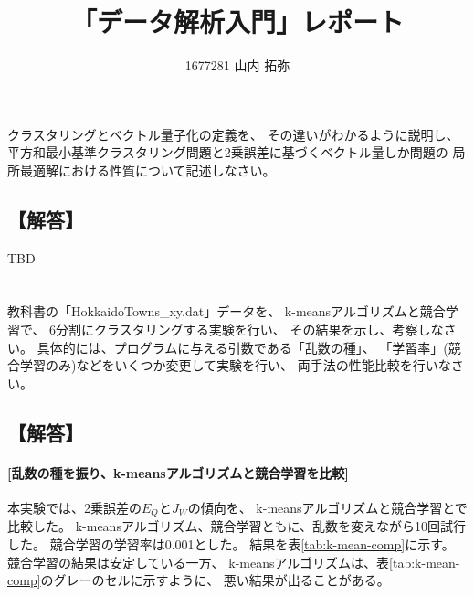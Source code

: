 \documentclass[a4j]{jarticle}
\title{「データ解析入門」レポート}
\author{1677281 山内 拓弥}
\begin{document}
\maketitle

\section{}
クラスタリングとベクトル量子化の定義を、
その違いがわかるように説明し、
平方和最小基準クラスタリング問題と2乗誤差に基づくベクトル量しか問題の
局所最適解における性質について記述しなさい。

\subsection{【解答】}
TBD

\section{}
教科書の「HokkaidoTowns\_xy\@.dat」データを、 k-meansアルゴリズムと競合学習で、
6分割にクラスタリングする実験を行い、 その結果を示し、考察しなさい。
具体的には、プログラムに与える引数である「乱数の種」、
「学習率」(競合学習のみ)などをいくつか変更して実験を行い、
両手法の性能比較を行いなさい。

\subsection{【解答】}

\paragraph{[乱数の種を振り、k-meansアルゴリズムと競合学習を比較]}
本実験では、2乗誤差の$E_Q$と$J_W$の傾向を、
k-meansアルゴリズムと競合学習とで比較した。
k-meansアルゴリズム、競合学習ともに、乱数を変えながら10回試行した。
競合学習の学習率は0.001とした。
結果を表\ref{tab:k-mean-comp}に示す。
競合学習の結果は安定している一方、
k-meansアルゴリズムは、表\ref{tab:k-mean-comp}のグレーのセルに示すように、
悪い結果が出ることがある。
\end{document}
